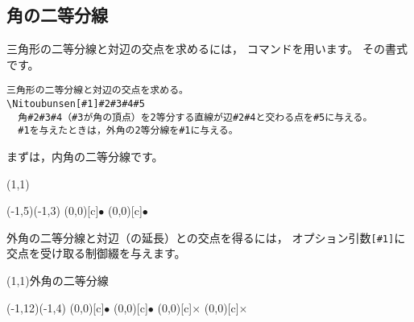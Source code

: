 \subsection{角の二等分線}
三角形の二等分線と対辺の交点を求めるには，
コマンドを用います。
その書式です。

\begin{boxnote}
\begin{verbatim}
三角形の二等分線と対辺の交点を求める。
\Nitoubunsen[#1]#2#3#4#5
  角#2#3#4（#3が角の頂点）を2等分する直線が辺#2#4と交わる点を#5に与える。
  #1を与えたときは，外角の2等分線を#1に与える。
\end{verbatim}
\end{boxnote}

まずは，内角の二等分線です。

\begin{showEx}(1,1){}
\begin{zahyou*}[ul=10mm](-1,5)(-1,3)\footnotesize
  \Nitoubunsen\B\A\C\D
  \Put{}
  \Drawline{\A\B\C\A\D}
  \B\A\D(0,0)[c]{$\bullet$}
  \D\A\C(0,0)[c]{$\bullet$}
\end{zahyou*}
\end{showEx}

外角の二等分線と対辺（の延長）との交点を得るには，
オプション引数\verb+[#1]+に交点を受け取る制御綴を与えます。

\begin{showEx}(1,1){外角の二等分線}
\begin{zahyou*}[ul=10mm](-1,12)(-1,4)\footnotesize
  \Nitoubunsen[\E]\B\A\C\D
  \Put{}
  \Put{}
  \Hantyokusen\B\C
  \Hantyokusen\B\A
  \Drawlines{\A\B\C\A\D;\A\E}
  \B\A\D(0,0)[c]{$\bullet$}
  \D\A\C(0,0)[c]{$\bullet$}
  \Bunten\A{}\T
  \C\A\E(0,0)[c]{$\times$}
  \E\A\T(0,0)[c]{$\times$}
\end{zahyou*}
\end{showEx}
